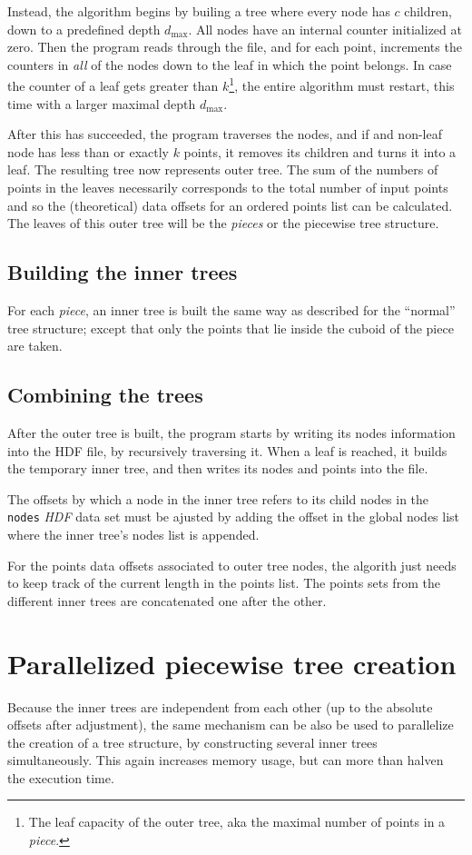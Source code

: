 \documentclass[a4paper,10pt,abstracton,notitlepage]{scrreprt}
\begin{document}
Instead, the algorithm begins by builing a tree where every node has $c$ children, down to a predefined depth $d_{\max}$. All nodes have an internal counter initialized at zero. Then the program reads through the file, and for each point, increments the counters in \emph{all} of the nodes down to the leaf in which the point belongs. In case the counter of a leaf gets greater than $k$\footnote{The leaf capacity of the outer tree, aka the maximal number of points in a \emph{piece}.}, the entire algorithm must restart, this time with a larger maximal depth $d_{\max}$.

After this has succeeded, the program traverses the nodes, and if and non-leaf node has less than or exactly $k$ points, it removes its children and turns it into a leaf. The resulting tree now represents outer tree. The sum of the numbers of points in the leaves necessarily corresponds to the total number of input points and so the (theoretical) data offsets for an ordered points list can be calculated. The leaves of this outer tree will be the \emph{pieces} or the piecewise tree structure.

\subsection{Building the inner trees}
For each \emph{piece}, an inner tree is built the same way as described for the ``normal'' tree structure; except that only the points that lie inside the cuboid of the piece are taken.

\subsection{Combining the trees}
After the outer tree is built, the program starts by writing its nodes information into the HDF file, by recursively traversing it. When a leaf is reached, it builds the temporary inner tree, and then writes its nodes and points into the file.

The offsets by which a node in the inner tree refers to its child nodes in the \texttt{nodes} \emph{HDF} data set must be ajusted by adding the offset in the global nodes list where the inner tree's nodes list is appended.

For the points data offsets associated to outer tree nodes, the algorith just needs to keep track of the current length in the points list. The points sets from the different inner trees are concatenated one after the other.


\section{Parallelized piecewise tree creation}
Because the inner trees are independent from each other (up to the absolute offsets after adjustment), the same mechanism can be also be used to parallelize the creation of a tree structure, by constructing several inner trees simultaneously. This again increases memory usage, but can more than halven the execution time.
\end{document}
